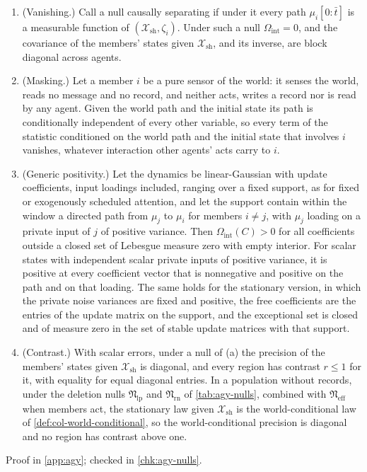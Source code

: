 \begin{proposition}\label{prop:agy-nulls-vanish}
\begin{enumerate}
\item[(a)] (Vanishing.) Call a null causally separating if under it every path $\mu_i[0{:}\bar t]$ is a measurable function of $(\mathcal X_{\mathrm{sh}},\zeta_i)$. Under such a null $\Omega_{\mathrm{int}}=0$, and the covariance of the members' states given $\mathcal X_{\mathrm{sh}}$, and its inverse, are block diagonal across agents.
\item[(b)] (Masking.) Let a member $i$ be a pure sensor of the world: it senses the world, reads no message and no record, and neither acts, writes a record nor is read by any agent. Given the world path and the initial state its path is conditionally independent of every other variable, so every term of the statistic conditioned on the world path and the initial state that involves $i$ vanishes, whatever interaction other agents' acts carry to $i$.
\item[(c)] (Generic positivity.) Let the dynamics be linear-Gaussian with update coefficients, input loadings included, ranging over a fixed support, as for fixed or exogenously scheduled attention, and let the support contain within the window a directed path from $\mu_j$ to $\mu_i$ for members $i\ne j$, with $\mu_j$ loading on a private input of $j$ of positive variance. Then $\Omega_{\mathrm{int}}(C)>0$ for all coefficients outside a closed set of Lebesgue measure zero with empty interior. For scalar states with independent scalar private inputs of positive variance, it is positive at every coefficient vector that is nonnegative and positive on the path and on that loading. The same holds for the stationary version, in which the private noise variances are fixed and positive, the free coefficients are the entries of the update matrix on the support, and the exceptional set is closed and of measure zero in the set of stable update matrices with that support.
\item[(d)] (Contrast.) With scalar errors, under a null of (a) the precision of the members' states given $\mathcal X_{\mathrm{sh}}$ is diagonal, and every region has contrast $r\le1$ for it, with equality for equal diagonal entries. In a population without records, under the deletion nulls $\mathfrak N_{\mathrm{lp}}$ and $\mathfrak N_{\mathrm{rn}}$ of \cref{tab:agy-nulls}, combined with $\mathfrak N_{\mathrm{eff}}$ when members act, the stationary law given $\mathcal X_{\mathrm{sh}}$ is the world-conditional law of \cref{def:col-world-conditional}, so the world-conditional precision is diagonal and no region has contrast above one.
\end{enumerate}
Proof in \cref{app:agy}; checked in \cref{chk:agy-nulls}.
\end{proposition}

